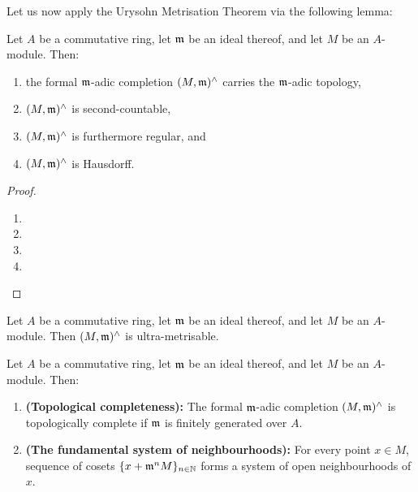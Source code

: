             Let us now apply the Urysohn Metrisation Theorem via the following lemma:
            \begin{lemma}
                Let $A$ be a commutative ring, let $\mathfrak{m}$ be an ideal thereof, and let $M$ be an $A$-module. Then:
                    \begin{enumerate}
                        \item the formal $\mathfrak{m}$-adic completion $(M, \mathfrak{m})^{\wedge}$ carries the $\mathfrak{m}$-adic topology,
                        \item $(M, \mathfrak{m})^{\wedge}$ is second-countable, 
                        \item $(M, \mathfrak{m})^{\wedge}$ is furthermore regular, and
                        \item $(M, \mathfrak{m})^{\wedge}$ is Hausdorff.
                    \end{enumerate}
            \end{lemma}
                \begin{proof}
                    \noindent
                    \begin{enumerate}
                        \item 
                        \item 
                        \item 
                        \item 
                    \end{enumerate}
                \end{proof}
            \begin{corollary}
                Let $A$ be a commutative ring, let $\mathfrak{m}$ be an ideal thereof, and let $M$ be an $A$-module. Then $(M, \mathfrak{m})^{\wedge}$ is ultra-metrisable.
            \end{corollary}
            \begin{proposition} \label{prop: topologically_complete_adic_modules}
                Let $A$ be a commutative ring, let $\mathfrak{m}$ be an ideal thereof, and let $M$ be an $A$-module. Then:
                    \begin{enumerate}
                        \item \textbf{(Topological completeness):} The formal $\mathfrak{m}$-adic completion $(M, \mathfrak{m})^{\wedge}$ is topologically complete if $\mathfrak{m}$ is finitely generated over $A$.
                        \item \textbf{(The fundamental system of neighbourhoods):} For every point $x \in M$, sequence of cosets $\{x + \mathfrak{m}^nM\}_{n \in \mathbb{N}}$ forms a system of open neighbourhoods of $x$.
                    \end{enumerate}
            \end{proposition}

